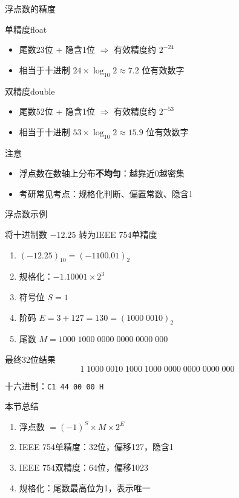 \documentclass[10pt, aspectratio=169]{beamer}
\begin{document}
\begin{frame}[t]{浮点数的精度}
    \begin{block}{单精度float}
        \begin{itemize}
            \item 尾数23位 + 隐含1位 $\Rightarrow$ 有效精度约 $2^{-24}$
            \item 相当于十进制 $24 \times \log_{10}2 \approx 7.2$ 位有效数字
        \end{itemize}
    \end{block}
    \begin{block}{双精度double}
        \begin{itemize}
            \item 尾数52位 + 隐含1位 $\Rightarrow$ 有效精度约 $2^{-53}$
            \item 相当于十进制 $53 \times \log_{10}2 \approx 15.9$ 位有效数字
        \end{itemize}
    \end{block}
    \vspace{0.5em}
    \begin{alertblock}{注意}
        \begin{itemize}
            \item 浮点数在数轴上分布\textbf{不均匀}：越靠近0越密集
            \item 考研常见考点：规格化判断、偏置常数、隐含1
        \end{itemize}
    \end{alertblock}
\end{frame}

\begin{frame}{浮点数示例}
    \begin{exampleblock}{将十进制数 $-12.25$ 转为IEEE 754单精度}
        \begin{enumerate}
            \item $(-12.25)_{10} = (-1100.01)_2$
            \item 规格化：$-1.10001 \times 2^3$
            \item 符号位 $S = 1$
            \item 阶码 $E = 3 + 127 = 130 = (1000\;0010)_2$
            \item 尾数 $M = 1000\;1000\;0000\;0000\;0000\;000$
        \end{enumerate}
    \end{exampleblock}
    \vspace{0.3em}
    \begin{block}{最终32位结果}
        \[
            1\;1000\;0010\;1000\;1000\;0000\;0000\;0000\;000
        \]
        \begin{center}
            十六进制：\texttt{C1 44 00 00 H}
        \end{center}
    \end{block}
\end{frame}

\begin{frame}{本节总结}
    \begin{enumerate}
        \item 浮点数 $= (-1)^S \times M \times 2^E$
        \item IEEE 754单精度：32位，偏移127，隐含1
        \item IEEE 754双精度：64位，偏移1023
        \item 规格化：尾数最高位为1，表示唯一
    \end{enumerate}
\end{frame}
\end{document}
